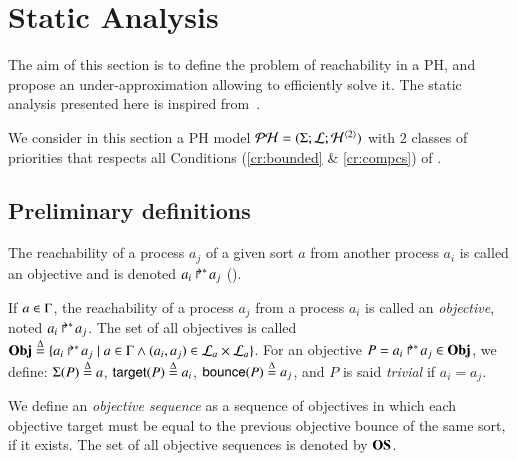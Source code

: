 \section{Static Analysis}\label{sec:sa}

The aim of this section is to define the problem of reachability in a PH,
and propose an under-approximation allowing to efficiently solve it.
The static analysis presented here is inspired from~\cite{PMR12-MSCS}.

We consider in this section a PH model $\mathcal{PH} = (\Sigma; \mathcal{L}; \mathcal{H}^{\langle 2 \rangle})$ with $2$ classes of priorities
that respects all Conditions (\ref{cr:bounded} \& \ref{cr:compcs}) of .



\subsection{Preliminary definitions}
\label{ssec:sa-def}

The reachability of a process $a_j$ of a given sort $a$ from another process $a_i$ is called an objective and is denoted $\mbox{${a}_{i}\Rsh^*\!{a}_{j}$}$ ().
\begin{definition}
\label{def:obj}
  If $a \in \Gamma$, the reachability of a process $a_j$ from a process $a_i$ is called an \emph{objective}, noted $\mbox{$a_i\Rsh^*\!a_j$}$.
  The set of all objectives is called $\mathbf{Obj} \stackrel{\Delta}= \{ \mbox{$a_i\Rsh^*\!a_j$} \mid a \in \Gamma \wedge (a_i, a_j) \in \mathcal{L}_a \times \mathcal{L}_a \}$.
  For an objective $P = \mbox{$a_i\Rsh^*\!a_j$} \in \mathbf{Obj}$, we define: $\Sigma(P) \stackrel{\Delta}=
  a$, $\mathsf{target}(P)\stackrel{\Delta}= a_i$, $\mathsf{bounce}(P)\stackrel{\Delta}= a_j$,
  and $P$ is said \emph{trivial} if $a_i = a_j$.

  We define an \emph{objective sequence} as a sequence of objectives in which each objective target must be equal to the previous objective bounce of the same sort, if it exists.
  The set of all objective sequences is denoted by $\mathbf{OS}$.
\end{definition}

